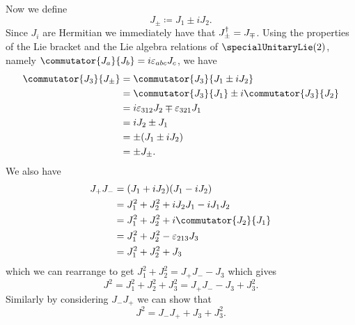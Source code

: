 Now we define
\begin{equation}
    J_{\pm} \coloneqq J_1 \pm i J_2.
\end{equation}
Since \(J_i\) are Hermitian we immediately have that \(J_{\pm}^{\dagger} = J_{\mp}\).
Using the properties of the Lie bracket and the Lie algebra relations of \(\specialUnitaryLie(2)\), namely \(\commutator{J_a}{J_b} = i\varepsilon_{abc}J_c\), we have
\begin{align}
    \commutator{J_3}{J_{\pm}} &= \commutator{J_3}{J_1 \pm iJ_2}\\
    &= \commutator{J_3}{J_1} \pm i \commutator{J_3}{J_2}\\
    &= i\varepsilon_{312}J_2 \mp \varepsilon_{321}J_1\\
    &= iJ_2 \pm J_1\\
    &= \pm(J_1 \pm iJ_2)\\
    &= \pm J_{\pm}.
\end{align}
We also have
\begin{align}
    J_+J_- &= (J_1 + iJ_2)(J_1 - iJ_2)\\
    &= J_1^2 + J_2^2 + iJ_2J_1 - iJ_1J_2\\
    &= J_1^2 + J_2^2 + i\commutator{J_2}{J_1}\\
    &= J_1^2 + J_2^2 - \varepsilon_{213}J_3\\
    &= J_1^2 + J_2^2 + J_3
\end{align}
which we can rearrange to get \(J_1^2 + J_2^2 = J_+J_- - J_3\) which gives
\begin{equation}\label{eqn:J^2 = J+J- - J3 + J3^2}
    J^2 = J_1^2 + J_2^2 + J_3^2 = J_+J_- - J_3 + J_3^2.
\end{equation}
Similarly by considering \(J_-J_+\) we can show that
\begin{equation}\label{eqn:J^2 = J-J+ + J3 + J3^2}
    J^2 = J_-J_+ + J_3 + J_3^2.
\end{equation}

